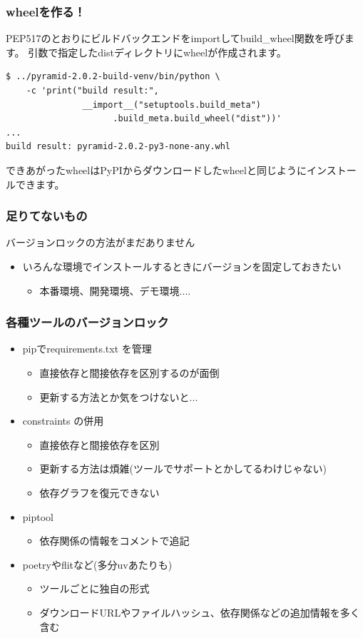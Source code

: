 \documentclass[aspectratio=169]{beamer}
\begin{document}
\begin{frame}[fragile]
\frametitle{wheelを作る！}
PEP517のとおりにビルドバックエンドをimportしてbuild\_wheel関数を呼びます。
引数で指定したdistディレクトリにwheelが作成されます。
\begin{lstlisting}
$ ../pyramid-2.0.2-build-venv/bin/python \
    -c 'print("build result:",
               __import__("setuptools.build_meta")
                     .build_meta.build_wheel("dist"))'
...
build result: pyramid-2.0.2-py3-none-any.whl
\end{lstlisting}
できあがったwheelはPyPIからダウンロードしたwheelと同じようにインストールできます。
\end{frame}

\begin{frame}
\frametitle{足りてないもの}
バージョンロックの方法がまだありません
\begin{itemize}
\item いろんな環境でインストールするときにバージョンを固定しておきたい
\begin{itemize}
\item 本番環境、開発環境、デモ環境....
\end{itemize}
\end{itemize}
\end{frame}

\begin{frame}
\frametitle{各種ツールのバージョンロック}
\begin{itemize}
\item pipでrequirements.txt を管理
\begin{itemize}
\item 直接依存と間接依存を区別するのが面倒
\item 更新する方法とか気をつけないと...
\end{itemize}
\item constraints の併用
\begin{itemize}
\item 直接依存と間接依存を区別
\item 更新する方法は煩雑(ツールでサポートとかしてるわけじゃない)
\item 依存グラフを復元できない
\end{itemize}
\item piptool
\begin{itemize}
\item 依存関係の情報をコメントで追記
\end{itemize}
\item poetryやflitなど(多分uvあたりも)
\begin{itemize}
\item ツールごとに独自の形式
\item ダウンロードURLやファイルハッシュ、依存関係などの追加情報を多く含む
\end{itemize}
\end{itemize}
\end{frame}
\end{document}
